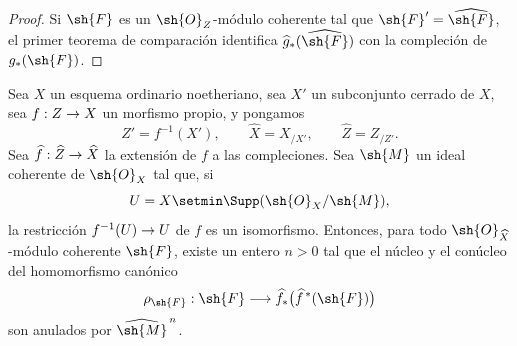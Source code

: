 \documentclass[oneside]{amsart}
\makeatletter
\newcommand{\ega@arrow}[2]{\mathchoice{#1}{#2}{#2}{#2}}
\renewcommand{\to}{\ega@arrow{\longrightarrow}{\rightarrow}}
\let\EGAOriginalLabel\label
\renewcommand{\label}[1]{\phantomsection\EGAOriginalLabel{#1}}
\makeatother
\begin{document}
\begin{proof}
Si $\sh{F}$ es un $\sh{O}_Z$-módulo coherente tal que
$\sh{F}'=\widehat{\sh{F}}$, el primer teorema de comparación
 identifica
$\widehat{g}_*(\widehat{\sh{F}})$ con la compleción de
$g_*(\sh{F})$.
\end{proof}

\begin{lemma}[5.3.4]
\label{III.5.3.4}
Sea $X$ un esquema ordinario noetheriano, sea $X'$ un subconjunto
cerrado de $X$, sea $f:Z\to X$ un morfismo propio, y pongamos
\[
  Z'=f^{-1}(X'),\qquad
  \widehat{X}=X_{/X'},\qquad
  \widehat{Z}=Z_{/Z'}.
\]
Sea $\widehat{f}:\widehat{Z}\to\widehat{X}$ la extensión de $f$
a las compleciones. Sea $\sh{M}$ un ideal coherente de
$\sh{O}_X$ tal que, si
\[
  U=X\setmin\Supp(\sh{O}_X/\sh{M}),
\]
la restricción $f^{-1}(U)\to U$ de $f$ es un isomorfismo. Entonces,
para todo $\sh{O}_{\widehat{X}}$-módulo coherente $\sh{F}$, existe
un entero $n>0$ tal que el núcleo y el conúcleo del homomorfismo
canónico
\[
  \rho_{\sh{F}}:
  \sh{F}\longrightarrow
  \widehat{f}_*\bigl(\widehat{f}^{\,*}(\sh{F})\bigr)
\]
 son anulados por
$\widehat{\sh{M}}^{\,n}$.
\end{lemma}
\end{document}
